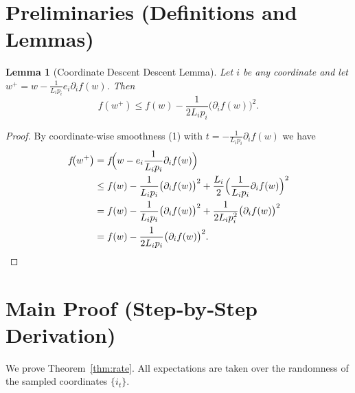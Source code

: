 \documentclass[11pt]{article}
\newtheorem{lemma}{Lemma}
\begin{document}
\section*{Preliminaries (Definitions and Lemmas)}
\begin{lemma}[Coordinate Descent Descent Lemma]\label{lem:descent}
Let \(i\) be any coordinate and let \(w^{+}=w-\frac{1}{L_{i}p_{i}}e_{i}\partial_{i}f(w)\). Then
\[
    f(w^{+})\le f(w)-\frac{1}{2L_{i}p_{i}}\bigl(\partial_{i}f(w)\bigr)^{2}.
\tag{9}
\]
\end{lemma}
\begin{proof}
By coordinate‑wise smoothness (1) with \(t=-\frac{1}{L_{i}p_{i}}\partial_{i}f(w)\) we have
\[
\begin{aligned}
f\!\bigl(w^{+}\bigr)
    &= f\!\Bigl(w-e_{i}\frac{1}{L_{i}p_{i}}\partial_{i}f(w)\Bigr)\\
    &\le f(w)-\frac{1}{L_{i}p_{i}}\bigl(\partial_{i}f(w)\bigr)^{2}
        +\frac{L_{i}}{2}\Bigl(\frac{1}{L_{i}p_{i}}\partial_{i}f(w)\Bigr)^{2}\\
    &= f(w)-\frac{1}{L_{i}p_{i}}\bigl(\partial_{i}f(w)\bigr)^{2}
        +\frac{1}{2L_{i}p_{i}^{2}}\bigl(\partial_{i}f(w)\bigr)^{2}\\
    &= f(w)-\frac{1}{2L_{i}p_{i}}\bigl(\partial_{i}f(w)\bigr)^{2}.
\end{aligned}
\]
\end{proof}

\section*{Main Proof (Step‑by‑Step Derivation)}
We prove Theorem~\ref{thm:rate}.  
All expectations are taken over the randomness of the sampled coordinates \(\{i_{t}\}\).
\end{document}
